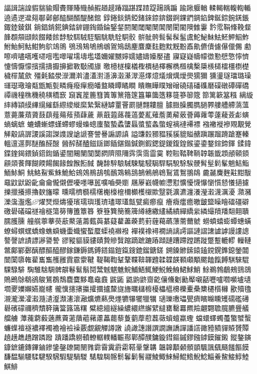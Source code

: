 諨諿諯諻貑貒貐賵賮賱賰賳赬赮趥趧踳踾踸蹀蹅踶踼踽蹁
踰踿躽輶輮輵輲輹輷輴遶遹遻邆郺鄳鄵鄶醓醐醑醍醏錧
錞錈錟錆錏鍺錸錼錛錣錒錁鍆錭錎錍鋋錝鋺錓鋹鋷錴錂錤
鋿錩錹錵錪錔錌錋鋾錉錀鋻錖閼闍閾閹閺閶閿閵閽隩雔霋
霒霐鞙鞗鞔韰韸頵頯頲餤餟餧餩馞駮駬駥駤駰駣駪駩駧骹
骿骴骻髶髺髹髷鬳鮀鮅鮇魼魾魻鮂鮓鮒鮐魺鮕魽鮈鴥鴗鴠
鴞鴔鴩鴝鴘鴢鴐鴙鴟麈麆麇麮麭黕黖黺鼒鼽儦儥儢儤儠儩
勴嚓嚌嚍嚆嚄嚃噾嚂噿嚁壖壔壏壒嬭嬥嬲嬣嬬嬧嬦嬯嬮孻
寱寲嶷幬幪徾懃憵憼懧懠懥懤懨懞擯擩擣擫擤擨斁斀斶旚
曒檍檖檁檥檉檟檛檡檞檇檓檎檕檃檨檤檑橿檦檚檅檌檒歛
殭氉濌澩濴濔濣濜濭濧濦濞濲濝濢濨燡燱燨燲燤燰燢獳獮
獯璗璲璫璐璪璭璱璥璯甐甑甒甏疄癃癈癉癇皤盩瞵瞫瞲瞷
瞶瞴瞱瞨矰磳磽礂磻磼磿磲礅磹磾礄禫禨穜穛穖穘穔穚窾
竀竁簅簏篲簀篿篻簎篴簋篳簂簉簃簁篸篽簆篰篱簐簊糨
縭縼繂縳顈縸縪繉繀繇縩繌縰縻縶繄縺罅罿罾罽翴翲耬膻
臄臌臊臅臇膼臩艛艚艜薃薀薏薧薕薠薋薣蕻薤薚薞蕷蕼薉
薡蕺蕸蕗薎薖薆薍薙薝薁薢薂薈薅蕹蕶薘薐薟虨螾螪螭蟅
螰螬螹螵螼螮蟉蟃蟂蟌螷螯蟄蟊螴螶螿螸螽蟞螲褵褳褼褾
襁襒褷襂覭覯覮觲觳謞謘謖謑謅謋謢謏謒謕謇謍謈謆謜謓
謚豏豰豲豱豯貕貔賹赯蹎蹍蹓蹐蹌蹇轃轀邅遾鄸醚醢醛醙
醟醡醝醠鎡鎃鎯鍤鍖鍇鍼鍘鍜鍶鍉鍐鍑鍠鍭鎏鍌鍪鍹鍗鍕
鍒鍏鍱鍷鍻鍡鍞鍣鍧鍎鍙闇闀闉闃闅閷隮隰隬霠霟霘霝霙
鞚鞡鞜鞞鞝韕韔韱顁顄顊顉顅顃餥餫餬餪餳餲餯餭餱餰馘
馣馡騂駺駴駷駹駸駶駻駽駾駼騃骾髾髽鬁髼魈鮚鮨鮞鮛鮦
鮡鮥鮤鮆鮢鮠鮯鴳鵁鵧鴶鴮鴯鴱鴸鴰鵅鵂鵃鴾鴷鵀鴽翵鴭
麊麉麍麰黈黚黻黿鼤鼣鼢齔⿕龠儱儭儮嚘嚜嚗嚚嚝嚙奰嬼
屩屪巀幭幮懘懟懭懮懱懪懰懫懖懩擿攄擽擸攁攃擼斔旛曚
曛曘櫅檹檽櫡櫆檺檶檷櫇檴檭歞毉氋瀇瀌瀍瀁瀅瀔瀎濿瀀
濻瀦濼濷瀊爁燿燹爃燽獶璸瓀璵瓁璾璶璻瓂甔甓癜癤癙
癐癓癗癚皦皽盬矂瞺礌礓礔礉礐礒礑禭禬穟簜簩簙簠簟簭
簝簦簨簢簥簰繜繐繖繣繘繢繟繑繠繗繓羵羳翷翸聵臑臒臐
艟艞薴藆藀藃藂薳薵薽藇藄薿藋藎藈藅薱薶藒蘤薸薷薾虩
蟧蟦蟢蟛蟫蟪蟥蟟蟳蟤蟔蟜蟓蟭蟘蟣蟗蟙蠁蟴蟨蟝襓襋襏
襌襆襐襑襉謪謧謣謳謰謵譇謯謼謾謱謥謷謦謶謮謤謻謽謺
豂豵貙貘貗賾贄贂贀蹜蹢蹠蹗蹖蹞蹥蹧蹛蹚蹡蹝蹩蹔轆轇
轈轋鄨鄺鄻鄾醨醥醧醯醪鎵鎌鎒鎷鎛鎝鎉鎧鎎鎪鎞鎦鎕鎈
鎙鎟鎀鎍鎱鎑鎲鎤鎨鎴鎣闒闓闑隳雗雚巂雟雘雝霣霢霥鞬
鞮鞨鞫鞤鞪鞢鞥韗韙韖韘韺顐顑顒颸饁餼餺騏騋騉騍騄騑
騊騅騇騆髀髜鬈鬄鬅鬩鬵魊魌魋鯇鯆鯃鮿鯁鮵鮸鯓鮶鯄鮹
鮽鵜鵓鵏鵊鵛鵋鵙鵖鵌鵗鵒鵔鵟鵘鵚麎麌黟鼁鼀鼖鼥鼫
鼪鼩鼨齌齕儴儵劖勷厴嚫嚭嚦嚧嚪嚬壚壝壛夒嬽嬾嬿巃幰
徿懻攇攐攍攉攌攎斄旞旝曞櫧櫠櫌櫑櫙櫋櫟櫜櫐櫫櫏櫍櫞
歠殰氌瀙瀧瀠瀖瀫瀡瀢瀣瀩瀗瀤瀜爌爊爇爂爅犥犦犤犣犡
瓋瓅璷瓃甖癠矉矊矄矱礝礛礡礜礗礞禰穧穨簳簼簹簬簻糬
糪繶繵繸繰繷繯繺繲繴繨罋罊羃羆羷翽翾聸臗臕舋艤艡艣
藫藱藭藙藡藨藚藗藬藲藸藘藟藣藜藑藰藦藯藞藢蠀蟺蠃蟶
蟷蠉蠌蠋蠆蟼蠈蟿蠊蠂襢襚襛襗襡襜襘襝襙覈覷覶觶譐譈
譊譀譓譖譔譋譕譑譂譒譗豃豷豶貚贆贇贉趬趪趭趫蹭蹸蹳
蹪蹯蹻軂轒轑轏轐轓辴酀鄿醰醭鏞鏇鏏鏂鏚鏐鏹鏬鏌鏙鎩
鏦鏊鏔鏮鏣鏕鏄鏎鏀鏒鎥鏧镽闚闛雡霩霫霬霨霦鞳鞷鞶韝
韞韟顜顙顝顗颿颽颻颾饈饇饃馦馧騚騕騥騝騤騛騢騠騧騣
騞騜騔髂鬋鬊鬎鬌鬷鯪鯫鯠鯞鯤鯦鯢鯰鯔鯗鯬鯜鯙鯥鯕鯡
